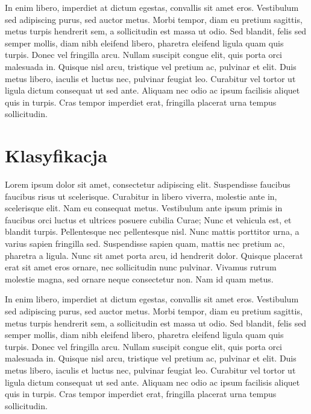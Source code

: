 In enim libero, imperdiet at dictum egestas, convallis sit amet eros. Vestibulum sed adipiscing purus, sed auctor metus. Morbi tempor, diam eu pretium sagittis, metus turpis hendrerit sem, a sollicitudin est massa ut odio. Sed blandit, felis sed semper mollis, diam nibh eleifend libero, pharetra eleifend ligula quam quis turpis. Donec vel fringilla arcu. Nullam suscipit congue elit, quis porta orci malesuada in. Quisque nisl arcu, tristique vel pretium ac, pulvinar et elit. Duis metus libero, iaculis et luctus nec, pulvinar feugiat leo. Curabitur vel tortor ut ligula dictum consequat ut sed ante. Aliquam nec odio ac ipsum facilisis aliquet quis in turpis. Cras tempor imperdiet erat, fringilla placerat urna tempus sollicitudin.

\section{Klasyfikacja}
Lorem ipsum dolor sit amet, consectetur adipiscing elit. Suspendisse faucibus faucibus risus ut scelerisque. Curabitur in libero viverra, molestie ante in, scelerisque elit. Nam eu consequat metus. Vestibulum ante ipsum primis in faucibus orci luctus et ultrices posuere cubilia Curae; Nunc et vehicula est, et blandit turpis. Pellentesque nec pellentesque nisl. Nunc mattis porttitor urna, a varius sapien fringilla sed. Suspendisse sapien quam, mattis nec pretium ac, pharetra a ligula. Nunc sit amet porta arcu, id hendrerit dolor. Quisque placerat erat sit amet eros ornare, nec sollicitudin nunc pulvinar. Vivamus rutrum molestie magna, sed ornare neque consectetur non. Nam id quam metus.

In enim libero, imperdiet at dictum egestas, convallis sit amet eros. Vestibulum sed adipiscing purus, sed auctor metus. Morbi tempor, diam eu pretium sagittis, metus turpis hendrerit sem, a sollicitudin est massa ut odio. Sed blandit, felis sed semper mollis, diam nibh eleifend libero, pharetra eleifend ligula quam quis turpis. Donec vel fringilla arcu. Nullam suscipit congue elit, quis porta orci malesuada in. Quisque nisl arcu, tristique vel pretium ac, pulvinar et elit. Duis metus libero, iaculis et luctus nec, pulvinar feugiat leo. Curabitur vel tortor ut ligula dictum consequat ut sed ante. Aliquam nec odio ac ipsum facilisis aliquet quis in turpis. Cras tempor imperdiet erat, fringilla placerat urna tempus sollicitudin.

